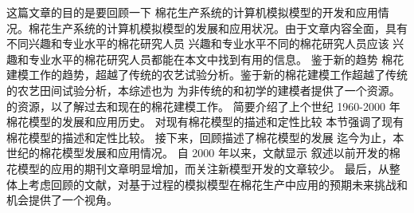 这篇文章的目的是要回顾一下 棉花生产系统的计算机模拟模型的开发和应用情况。棉花生产系统的计算机模拟模型的发展和应用状况。由于文章内容全面，具有不同兴趣和专业水平的棉花研究人员 兴趣和专业水平不同的棉花研究人员应该 兴趣和专业水平的棉花研究人员都能在本文中找到有用的信息。
鉴于新的趋势 棉花建模工作的趋势，超越了传统的农艺试验分析。鉴于新的棉花建模工作超越了传统的农艺田间试验分析，本综述也为 为非传统的和初学的建模者提供了一个资源。的资源，以了解过去和现在的棉花建模工作。
简要介绍了上个世纪 1960-2000 年棉花模型的发展和应用历史。
对现有棉花模型的描述和定性比较 本节强调了现有棉花模型的描述和定性比较。
接下来，回顾描述了棉花模型的发展 迄今为止，本世纪的棉花模型发展和应用情况。
自 2000 年以来，文献显示 叙述以前开发的棉花模型的应用的期刊文章明显增加，而关注新模型开发的文章较少。
最后，从整体上考虑回顾的文献，对基于过程的模拟模型在棉花生产中应用的预期未来挑战和机会提供了一个视角。


